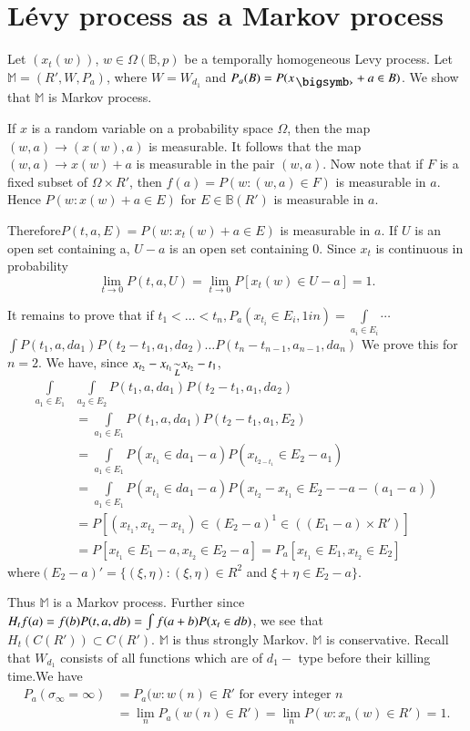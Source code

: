 \section{L\'evy process as a Markov process}\label{chap4-sec6}  %

Let $(x_t (w))$, $w \in \Omega (\mathbb{B},p)$ be a temporally
homogeneous Levy process. Let $\mathbb{M}= (R', W, P_a)$, where $W=
W_{d_1}$ and $P_a (B) = P(x_{\bigdot} + a \in  B)$. We show that
$\mathbb{M}$ is Markov process. 

If $x$ is a random variable on a probability space $\Omega$, then the
map $(w,a) \to (x(w),a)$ is measurable. It follows that the map $(w,a)
\to x(w)+a$ is measurable in the pair $(w,a)$. Now note that if $F$ is
a fixed subset of $\Omega \times R'$, then $f(a)= P(w: (w, a) \in F)$
is measurable in $a$. Hence $P (w : x (w) + a \in  E)$ for $E \in
\mathbb{B} (R')$ is measurable in $a$. 

Therefore\pageoriginale $P(t, a, E) = P(w: x_t (w) + a \in E)$ is
measurable in 
$a$. If $U$ is an open set containing a, $U-a$ is an open set
containing $0$. Since $x_t$ is continuous in probability 
$$
\lim_{t \to 0}P(t, a, U) = \lim_{t \to 0} P[x_t(w) \in U-a ]=1.
$$

It remains to prove that if $t_1 < \ldots < t_n, P_a(x_{t_{i}} \in
E_i,1 i n)= \int \limits_{a_i \in E_i} \cdots$ $\int P(t_1, a, da_1)
P(t_2 - t_1, a_1, da_2) \ldots P(t_n - t_{n-1}, a_{n-1}, da_n)$ We
prove this for $n=2$. We have, since $x_{t_{2}} - x_{t_{1}} {\displaystyle{\mathop{\sim}_{L}}}
x_{t_{2}} - t_1$, 
\begin{align*}
  \int \limits_{a_1 \in E_1} & \int \limits_{a_2 \in E_2} P(t_1, a, da_1)
  P(t_2 - t_1, a_1, da_2)\\
& = \int \limits_{a_1 \in E_1} P(t_1, a, da_1)
  P(t_2 - t_1, a_{1},E_2) \\
  & = \int \limits_{a_1 \in E_1} P(x_{t_{1}} \in da_1 -a) P(x_{t_{2 -
      t_1}} \in E_2-a_1)\\ 
  & = \int \limits_{a_1 \in E_1} P(x_{t_{1}} \in da_1 -a) P(x_{t_{2}}-
  x_{t_{1}} \in E_2--a-(a_1-a))\\ 
  &= P[(x_{t_{1}}, x_{t_{2}} - x_{t_{1}}) \in (E_2 -a)^1 \in ((E_1 -a) \times R')]\\
  &= P[x_{t_{1}} \in E_1-a, x_{t_{2}} \in E_2 -a] = P_a [x_{t_{1}} \in
    E_1, x_{t_{2}} \in E_2]  
\end{align*}
where$(E_2-a)'= \{ (\xi, \eta) : (\xi, \eta) \in R^2$ and $\xi + \eta
\in E_2 -a \}$. 

Thus $\mathbb{M}$ is a Markov process. Further since $H_t f(a) = f(b)
P(t, a, db)\break = \int f(a+b) P(x_t \in db)$, we see that $H_t(C(R'))
\subset C(R')$. $\mathbb{M}$ is thus strongly Markov.  $\mathbb{M}$ is
conservative. Recall that $W_{d_{1}}$ consists of all functions which
are of $d_1-$ type before their killing time.\pageoriginale We have  
\begin{align*}
  P_a(\sigma_{\infty} = \infty ) &= P_a (w: w(n) \in R' \text{ for
    every integer }n \\ 
  & = \lim_{n} P_a(w(n) \in R') = \lim_{n} P(w: x_n(w) \in R') = 1.
 \end{align*} 
 
